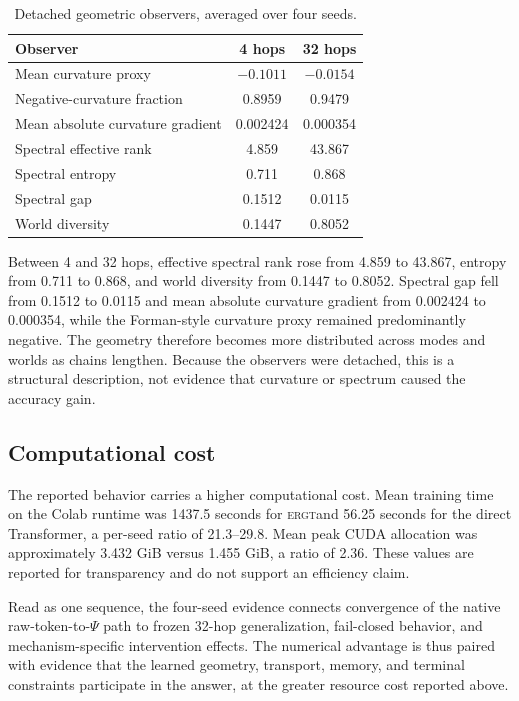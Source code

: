 \documentclass[11pt]{article}
\newcommand{\ERGT}{\textsc{ergt}}
\begin{document}
\begin{table}[t]
\centering
\caption{Detached geometric observers, averaged over four seeds.}
\label{tab:observers}
\small
\begin{tabular}{@{}lcc@{}}
\toprule
Observer & 4 hops & 32 hops \\
\midrule
Mean curvature proxy & $-0.1011$ & $-0.0154$ \\
Negative-curvature fraction & 0.8959 & 0.9479 \\
Mean absolute curvature gradient & 0.002424 & 0.000354 \\
Spectral effective rank & 4.859 & 43.867 \\
Spectral entropy & 0.711 & 0.868 \\
Spectral gap & 0.1512 & 0.0115 \\
World diversity & 0.1447 & 0.8052 \\
\bottomrule
\end{tabular}
\end{table}

Between 4 and 32 hops, effective spectral rank rose from 4.859 to 43.867,
entropy from 0.711 to 0.868, and world diversity from 0.1447 to 0.8052.
Spectral gap fell from 0.1512 to 0.0115 and mean absolute curvature gradient
from 0.002424 to 0.000354, while the Forman-style curvature proxy remained
predominantly negative. The geometry therefore becomes more distributed across
modes and worlds as chains lengthen. Because the observers were detached, this
is a structural description, not evidence that curvature or spectrum caused
the accuracy gain.

\subsection{Computational cost}

The reported behavior carries a higher computational cost. Mean training time
on the Colab runtime was 1437.5 seconds for \ERGT and 56.25 seconds for the
direct Transformer, a per-seed ratio of 21.3--29.8. Mean peak CUDA allocation
was approximately 3.432 GiB versus 1.455 GiB, a ratio of 2.36. These values are
reported for transparency and do not support an efficiency claim.

Read as one sequence, the four-seed evidence connects convergence of the native
raw-token-to-$\Psi$ path to frozen 32-hop generalization, fail-closed behavior,
and mechanism-specific intervention effects. The numerical advantage is thus
paired with evidence that the learned geometry, transport, memory, and terminal
constraints participate in the answer, at the greater resource cost reported
above.
\end{document}
